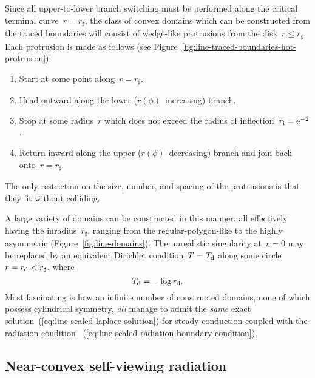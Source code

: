 \begin{figure}
\end{figure}

Since all upper-to-lower branch switching must be performed
along the critical terminal curve~$r = r_\sharp$,
the class of convex domains which can be constructed
from the traced boundaries
will consist of wedge-like protrusions from the disk~$r \le r_\sharp$.
Each protrusion is made as follows
(see Figure~\ref{fig:line-traced-boundaries-hot-protrusion}):
\begin{enumerate}
  \tightlist
  \item
    Start at some point along~$r = r_\sharp$.
  \item
    Head outward along the lower ($r (\phi)$~increasing) branch.
  \item
    Stop at some radius~$r$ which does not exceed
    the radius of inflection~$r_{\mathrm{i}} = \mathrm{e}^{-2}$.
  \item
    Return inward along the upper ($r (\phi)$~decreasing) branch
    and join back onto~$r = r_\sharp$.
\end{enumerate}
The only restriction on the size, number, and spacing of the protrusions
is that they fit without colliding.

A large variety of domains can be constructed in this manner,
all effectively having the inradius~$r_\sharp$,
ranging from the regular-polygon-like to the highly asymmetric
(Figure~\ref{fig:line-domains}).
The unrealistic singularity at~$r = 0$
may be replaced by an equivalent Dirichlet condition~$T = T_{\mathrm{d}}$
along some circle~$r = r_{\mathrm{d}} < r_\sharp$,
where
\begin{equation}
  T_{\mathrm{d}} = -\log r_{\mathrm{d}}.
  \label{eq:line-scaled-equivalent-dirichlet-relation}
\end{equation}
Most fascinating is how an infinite number of constructed domains,
none of which possess cylindrical symmetry,
\emph{all} manage to admit
the \emph{same} exact solution~(\ref{eq:line-scaled-laplace-solution})
for steady conduction coupled with the radiation condition~%
  (\ref{eq:line-scaled-radiation-boundary-condition}).

\subsection{Near-convex self-viewing radiation}
\label{sec:polar.convex.self-viewing}

